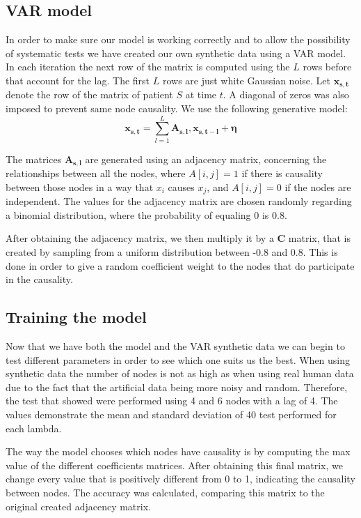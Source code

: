 \documentclass[10pt,conference,compsocconf]{IEEEtran}
\begin{document}
\subsection{VAR model}
\label{var}
In order to make sure our model is working correctly and to allow the possibility of systematic tests we have created our own synthetic data using a VAR model. In each iteration the next row of the matrix is computed using the $L$ rows before that account for the lag. The first $L$ rows are just white Gaussian noise. Let $\mathbf{x_{s,t}}$ denote the row of the matrix of patient $S$ at time $t$. A diagonal of zeros was also imposed to prevent same node causality. We use the following generative model:
\begin{equation}
{\mathbf{x_{s,t}}}=\sum_{l=1}^{L}\mathbf{A_{s,l},\mathbf{x_{s,t-l}}} + \boldsymbol\eta
\label{eq:VAR_model}
\end{equation}

The matrices $\mathbf{A_{s,l}}$ are generated using an adjacency matrix, concerning the relationships between all the nodes, where $A[i,j] = 1$ if there is causality between those nodes in a way that $x_i$ causes $x_j$, and $A[i,j] = 0$ if the nodes are independent. The values for the adjacency matrix are chosen randomly regarding a binomial distribution, where the probability of equaling 0 is 0.8. 

After obtaining the adjacency matrix, we then multiply it by a $\textbf{C}$ matrix, that is created by sampling from a uniform distribution between -0.8 and 0.8. This is done in order to give a random coefficient weight to the nodes that do participate in the causality. 

\subsection{Training the model}
Now that we have both the model and the VAR synthetic data we can begin to test different parameters in order to see which one suits us the best. When using synthetic data the number of nodes is not as high as when using real human data due to the fact that the artificial data being more noisy and random. Therefore, the test that showed were performed using 4 and 6 nodes with a lag of 4. The values demonstrate the mean and standard deviation of 40 test performed for each lambda.


The way the model chooses which nodes have causality is by computing the max value of the different coefficients matrices. After obtaining this final matrix, we change every value that is positively different from 0 to 1, indicating the causality between nodes. The accuracy was calculated, comparing this matrix to the original created adjacency matrix.
\end{document}
